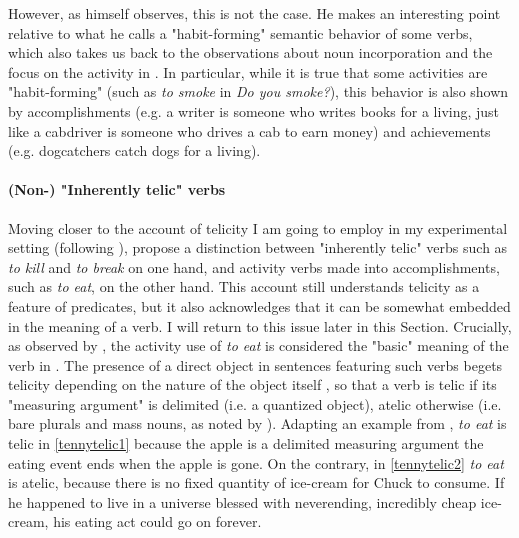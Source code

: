 However, as \textcite[151]{Vendler1957} himself observes, this is not the case. He makes an interesting point relative to what he calls a "habit-forming" semantic behavior of some verbs, which also takes us back to the observations about noun incorporation and the focus on the activity in . In particular, while it is true that some activities are "habit-forming" (such as \textit{to smoke} in \textit{Do you smoke?}), this behavior is also shown by accomplishments (e.g. a writer is someone who writes books for a living, just like a cabdriver is someone who drives a cab to earn money) and achievements (e.g. dogcatchers catch dogs for a living).

\paragraph{(Non-) "Inherently telic" verbs}
Moving closer to the account of telicity I am going to employ in my experimental setting (following \textcite{Medina2007}), \textcite[112]{vanvalinlapolla1997syntax} propose a distinction between "inherently telic" verbs such as \textit{to kill} and \textit{to break} on one hand, and activity verbs made into accomplishments, such as \textit{to eat}, on the other hand. This account still understands telicity as a feature of predicates, but it also acknowledges that it can be somewhat embedded in the meaning of a verb. I will return to this issue later in this Section. Crucially, as observed by \textcite[5-6]{NewmanRice2006}, the activity use of \textit{to eat} is considered the "basic" meaning of the verb in \textcite{vanvalinlapolla1997syntax}. The presence of a direct object in sentences featuring such verbs begets telicity depending on the nature of the object itself \parencite{tenny1994aspectual, dowty1991thematic}, so that a verb is telic if its "measuring argument" is delimited (i.e. a quantized object), atelic otherwise (i.e. bare plurals and mass nouns, as noted by \textcite{verkuyl1972compositional, verkuyl1989aspectual}). Adapting an example from \textcite[24]{tenny1994aspectual}, \textit{to eat} is telic in \ref{tennytelic1} because the apple is a delimited measuring argument \textemdash the eating event ends when the apple is gone. On the contrary, in \ref{tennytelic2} \textit{to eat} is atelic, because there is no fixed quantity of ice-cream for Chuck to consume. If he happened to live in a universe blessed with neverending, incredibly cheap ice-cream, his eating act could go on forever.

